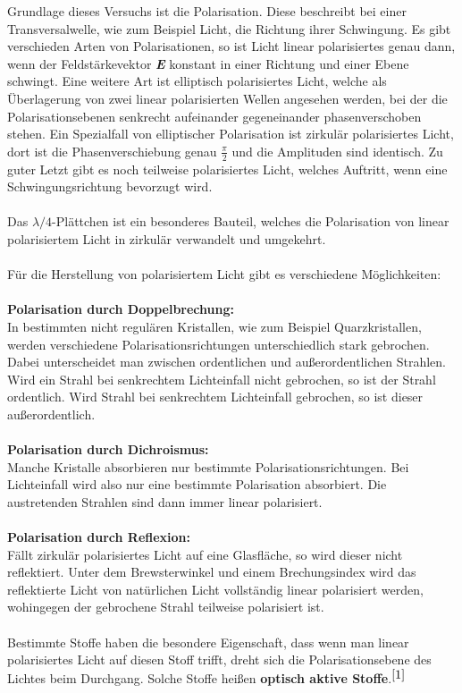 \documentclass[fontsize=12pt]{scrartcl}
\begin{document}
Grundlage dieses Versuchs ist die Polarisation. Diese beschreibt bei einer Transversalwelle, wie zum Beispiel Licht, die Richtung ihrer Schwingung. 
Es gibt verschieden Arten von Polarisationen, so ist Licht linear polarisiertes genau dann, wenn der Feldstärkevektor \emph{\textbf{E}} konstant in einer 
Richtung und einer Ebene schwingt. Eine weitere Art ist elliptisch polarisiertes Licht, welche als Überlagerung von zwei linear polarisierten Wellen angesehen 
werden, bei der die Polarisationsebenen senkrecht aufeinander gegeneinander phasenverschoben stehen. Ein Spezialfall von elliptischer Polarisation ist zirkulär 
polarisiertes Licht, dort ist die Phasenverschiebung genau $\frac{\pi}{2}$ und die Amplituden sind identisch. Zu guter Letzt gibt es noch teilweise polarisiertes 
Licht, welches Auftritt, wenn eine Schwingungsrichtung bevorzugt wird.\\
~\\
Das $\lambda/4$-Plättchen ist ein besonderes Bauteil, welches die Polarisation von linear polarisiertem Licht in zirkulär verwandelt und umgekehrt.\\
~\\
Für die Herstellung von polarisiertem Licht gibt es verschiedene Möglichkeiten:\\
~\\
\textbf{Polarisation durch Doppelbrechung:} \\
In bestimmten  nicht regulären Kristallen, wie zum Beispiel Quarzkristallen, werden verschiedene Polarisationsrichtungen unterschiedlich stark gebrochen.
Dabei unterscheidet man zwischen \glqq ordentlichen \grqq und \glqq außerordentlichen \grqq Strahlen. 
Wird ein Strahl bei senkrechtem Lichteinfall nicht gebrochen, so ist der Strahl ordentlich. Wird Strahl bei senkrechtem Lichteinfall gebrochen, so ist dieser außerordentlich. \\
~\\
\textbf{Polarisation durch Dichroismus:} \\
Manche Kristalle absorbieren nur bestimmte Polarisationsrichtungen. Bei Lichteinfall wird also nur eine bestimmte Polarisation absorbiert. Die austretenden 
Strahlen sind dann immer linear polarisiert.\\
~\\
\textbf{Polarisation durch Reflexion:} \\
Fällt zirkulär polarisiertes Licht auf eine Glasfläche, so wird dieser nicht reflektiert. Unter dem Brewsterwinkel und einem Brechungsindex wird das reflektierte 
Licht von natürlichen Licht vollständig linear polarisiert werden, wohingegen der gebrochene Strahl teilweise polarisiert ist.\\
~\\
Bestimmte Stoffe haben die besondere Eigenschaft, dass wenn man linear polarisiertes Licht auf diesen Stoff trifft, dreht sich die Polarisationsebene des 
Lichtes beim Durchgang. Solche Stoffe heißen {\textbf{optisch aktive Stoffe}}.$^{\cite{1}}$
\newpage
\end{document}
